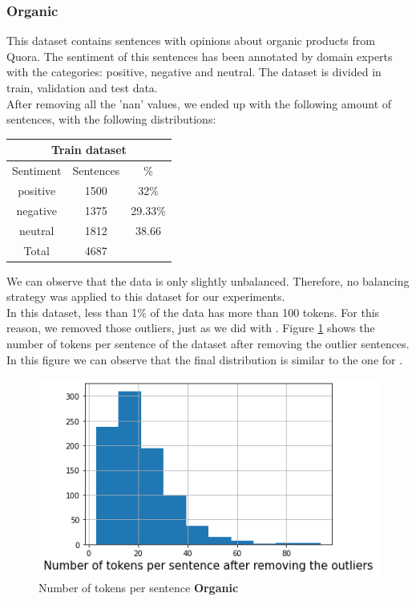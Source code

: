 \subsubsection{Organic}
This dataset contains sentences with opinions about organic products from Quora. The sentiment of this sentences has been annotated by domain experts with the categories: positive, negative and neutral. The dataset is divided in train, validation and test data.\\
After removing all the 'nan' values, we ended up with the following amount of sentences, with the following distributions:
\begin{center}
 \begin{tabular}{||c c c||} 
 \multicolumn{3}{c}{\bf Train dataset} \\
 \hline
 Sentiment & Sentences & \%\\ [0.4ex] 
 \hline\hline
 positive & 1500 & 32\%\\ 
 \hline
 negative & 1375 & 29.33\%\\
 \hline
 neutral & 1812 & 38.66\\
 \hline\hline
 Total & 4687 & \\
 \hline
\end{tabular}
\end{center}
We can observe that the data is only slightly unbalanced. Therefore, no balancing strategy was applied to this dataset for our experiments.\\
In this dataset, less than 1\% of the data has more than 100 tokens. For this reason, we removed those outliers, just as we did with \dataEN. Figure \ref{organic_tokens_per_sentence} shows the number of tokens per sentence of the dataset after removing the outlier sentences. In this figure we can observe that the final distribution is similar to the one for \dataEN.\\
\begin{figure}[h]
\centerline{\includegraphics[scale=.5]{images/tokens_per_sentence_organic_after.png}}
\caption{Number of tokens per sentence {\bf Organic}}
\label{organic_tokens_per_sentence}
\end{figure}\\
